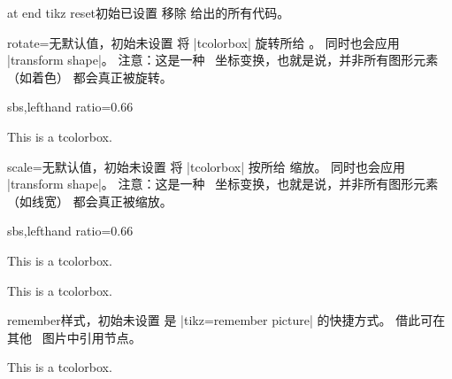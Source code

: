 \begin{docTcbKey}{at end tikz reset}{}{初始已设置}
  移除  给出的所有代码。
\end{docTcbKey}


\clearpage
\begin{docTcbKey}{rotate}{=}{无默认值，初始未设置}
  将 |tcolorbox| 旋转所给 。
  同时也会应用 |transform shape|。
  注意：这是一种 \tikzname\ 坐标变换，也就是说，并非所有图形元素（如着色）
  都会真正被旋转。
\begin{dispExample*}{sbs,lefthand ratio=0.66}

\begin{tcolorbox}[title=Rotated box,rotate=30]
This is a tcolorbox.
\end{tcolorbox}
\end{dispExample*}
\end{docTcbKey}

\begin{docTcbKey}{scale}{=}{无默认值，初始未设置}
  将 |tcolorbox| 按所给  缩放。
  同时也会应用 |transform shape|。
  注意：这是一种 \tikzname\ 坐标变换，也就是说，并非所有图形元素（如线宽）
  都会真正被缩放。
\begin{dispExample*}{sbs,lefthand ratio=0.66}

\begin{tcolorbox}[title=Scaled box,scale=0.5]
This is a tcolorbox.
\end{tcolorbox}
\begin{tcolorbox}[title=Scaled box,scale=1.25]
This is a tcolorbox.
\end{tcolorbox}
\end{dispExample*}
\end{docTcbKey}


\begin{docTcbKey}{remember}{}{样式，初始未设置}
  是 |tikz={remember picture}| 的快捷方式。
  借此可在其他 \tikzname\ 图片中引用节点。
\begin{dispExample}
\begin{tcolorbox}[enhanced,remember,colback=red!5!white,colframe=red!75!black,
  fonttitle=\bfseries,title=The four corners of a paper,
  overlay={\draw[red!50!white,line width=1mm,opacity=0.5,shorten >=3mm]
    (frame.north west) edge[->] (current page.north west)
    (frame.north east) edge[->] (current page.north east)
    (frame.south west) edge[->] (current page.south west)
    (frame.south east) edge[->] (current page.south east);}]
This is a tcolorbox.
\end{tcolorbox}
\end{dispExample}
\end{docTcbKey}

